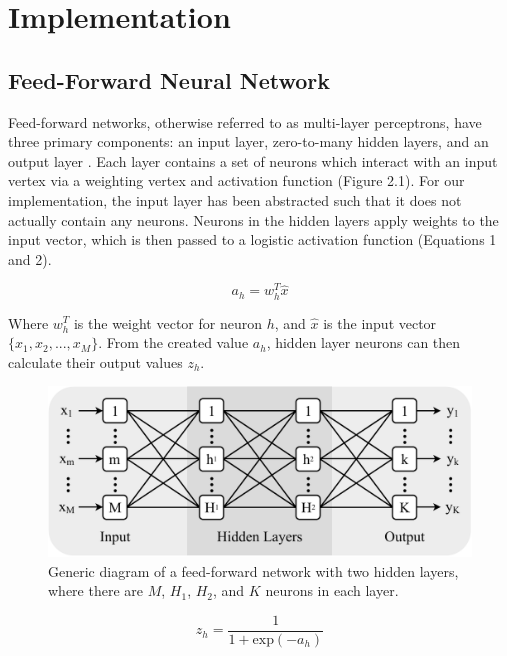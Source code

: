 \section{Implementation}\label{sec:implementation}

\subsection{Feed-Forward Neural Network}

Feed-forward networks, otherwise referred to as multi-layer perceptrons, have three primary components: an input layer, zero-to-many hidden layers, and an output layer \citep{Fine1999}. Each layer contains a set of neurons which interact with an input vertex via a weighting vertex and activation function (Figure 2.1). For our implementation, the input layer has been abstracted such that it does not actually contain any neurons. Neurons in the hidden layers apply weights to the input vector, which is then passed to a logistic activation function (Equations 1 and 2).

\begin{equation}
a_h = w^T_h\hat{x}
\end{equation}

Where $w^T_h$ is the weight vector for neuron $h$, and $\hat{x}$ is the input vector $\{x_1, x_2, ..., x_M\}$. From the created value $a_h$, hidden layer neurons can then calculate their output values $z_h$.

\begin{figure}[b!]
	\centering
	\includegraphics[width=0.9\linewidth]{images/feed_forward_diagram.pdf}
	\caption{Generic diagram of a feed-forward network with two hidden layers, where there are $M$, $H_1$, $H_2$, and $K$ neurons in each layer.}
\end{figure}

\begin{equation}
z_h = \frac{1}{1 + \text{exp}\left({-a_h}\right)}
\end{equation}

